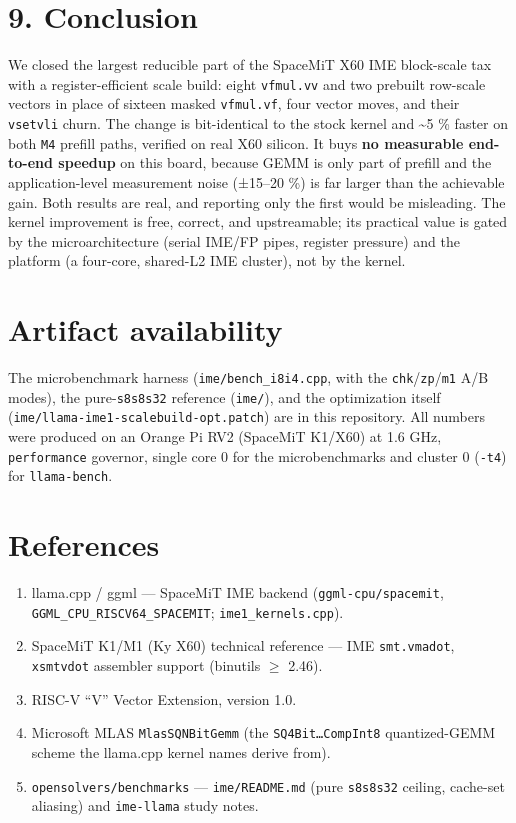 \documentclass[
]{article}
\providecommand{\tightlist}{%
  \setlength{\itemsep}{0pt}\setlength{\parskip}{0pt}}
\begin{document}
\section{9. Conclusion}\label{conclusion}

We closed the largest reducible part of the SpaceMiT X60 IME block-scale
tax with a register-efficient scale build: eight \texttt{vfmul.vv} and
two prebuilt row-scale vectors in place of sixteen masked
\texttt{vfmul.vf}, four vector moves, and their \texttt{vsetvli} churn.
The change is bit-identical to the stock kernel and \textasciitilde5 \%
faster on both \texttt{M4} prefill paths, verified on real X60 silicon.
It buys \textbf{no measurable end-to-end speedup} on this board, because
GEMM is only part of prefill and the application-level measurement noise
(±15--20 \%) is far larger than the achievable gain. Both results are
real, and reporting only the first would be misleading. The kernel
improvement is free, correct, and upstreamable; its practical value is
gated by the microarchitecture (serial IME/FP pipes, register pressure)
and the platform (a four-core, shared-L2 IME cluster), not by the
kernel.

\section{Artifact availability}\label{artifact-availability}

The microbenchmark harness (\texttt{ime/bench\_i8i4.cpp}, with the
\texttt{chk}/\texttt{zp}/\texttt{m1} A/B modes), the
pure-\texttt{s8s8s32} reference (\texttt{ime/}), and the optimization
itself (\texttt{ime/llama-ime1-scalebuild-opt.patch}) are in this
repository. All numbers were produced on an Orange Pi RV2 (SpaceMiT
K1/X60) at 1.6 GHz, \texttt{performance} governor, single core 0 for the
microbenchmarks and cluster 0 (\texttt{-t4}) for \texttt{llama-bench}.

\section{References}\label{references}

\begin{enumerate}
\def\labelenumi{\arabic{enumi}.}
\tightlist
\item
  llama.cpp / ggml --- SpaceMiT IME backend (\texttt{ggml-cpu/spacemit},
  \texttt{GGML\_CPU\_RISCV64\_SPACEMIT}; \texttt{ime1\_kernels.cpp}).
\item
  SpaceMiT K1/M1 (Ky X60) technical reference --- IME
  \texttt{smt.vmadot}, \texttt{xsmtvdot} assembler support (binutils
  \(\geq\) 2.46).
\item
  RISC-V ``V'' Vector Extension, version 1.0.
\item
  Microsoft MLAS \texttt{MlasSQNBitGemm} (the \texttt{SQ4Bit…CompInt8}
  quantized-GEMM scheme the llama.cpp kernel names derive from).
\item
  \texttt{opensolvers/benchmarks} --- \texttt{ime/README.md} (pure
  \texttt{s8s8s32} ceiling, cache-set aliasing) and \texttt{ime-llama}
  study notes.
\end{enumerate}
\end{document}
